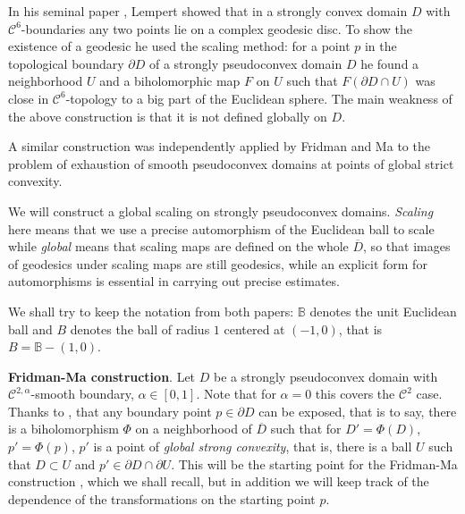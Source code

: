 \documentclass[a4paper,12pt]{amsart}
\theoremstyle{remark}\newtheorem{remark}[theorem]{Remark}
\begin{document}
In his seminal paper \cite{L1}, Lempert showed 
that in a strongly 
convex domain $D$
with $\mathcal C^6$-boundaries any two points lie on a 
complex geodesic disc.
To show the existence of a geodesic he 
used the scaling method: for a point $p$ in the topological boundary $\partial D$ of a strongly pseudoconvex domain $D$ he found a neighborhood $U$ and a biholomorphic map $F$ on $U$ such that $F(\partial D\cap U)$ was close in $\mathcal C^6$-topology to a big part of the Euclidean sphere. The main weakness of the above construction is that it is not defined globally on $D$.

A similar construction was independently applied by Fridman and Ma \cite{FM} to the problem of exhaustion of smooth pseudoconvex domains at points of global strict convexity. 

We will construct a global scaling on strongly pseudoconvex domains. \emph{Scaling} here means that we use a precise automorphism of the Euclidean ball to scale while \emph{global} means that scaling maps are defined on the whole $\overline D$, so that images of geodesics under scaling maps are still geodesics, while an explicit form for automorphisms is essential in carrying out precise estimates.

We shall try to keep the notation from both papers: $\mathbb B$ denotes the unit Euclidean ball and $B$ denotes the ball of radius $1$ centered at $(-1,0)$, that is $B= \mathbb B- (1,0)$.
 

\bigskip

{\bf Fridman-Ma construction}. Let $D$ be a strongly pseudoconvex domain with $\mathcal C^{2,\alpha}$-smooth boundary, $\alpha\in [0,1]$. Note that for $\alpha=0$ this covers 
the $\mathcal C^2$ case. Thanks to \cite{DFW}, that any boundary point  $p\in \partial D$ can be exposed, that is to say, there is a  biholomorphism $\Phi$ on a neighborhood of $\overline D$ such that for $D'=\Phi(D)$, $p'=\Phi(p)$, $p'$ is a point of \emph{ global strong convexity}, that is, there is a ball $U$ such that $D\subset U$ and $p' \in \partial D \cap \partial U$. This will be the starting point for the Fridman-Ma construction  \cite{FM}, which we shall recall, but in addition we will keep track of the dependence of the transformations on the starting point $p$.
\end{document}
